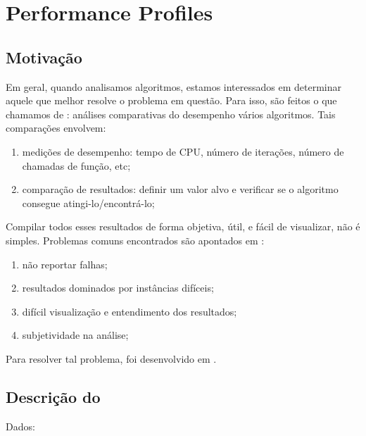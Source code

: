\section{Performance Profiles}
\label{section:performance-profiles}

\subsection{Motivação}
\label{subsection:motivation-perfprof}

Em geral, quando analisamos algoritmos, estamos interessados em determinar aquele que melhor resolve o problema em questão. Para isso, são feitos o que chamamos de \benchmarks: análises comparativas do desempenho vários algoritmos. Tais comparações envolvem:

\begin{enumerate}
    \item medições de desempenho: tempo de CPU, número de iterações, número de chamadas de função, etc;
    \item comparação de resultados: definir um valor alvo e verificar se o algoritmo consegue atingi-lo/encontrá-lo;
\end{enumerate}

Compilar todos esses resultados de forma objetiva, útil, e fácil de visualizar, não é simples. Problemas comuns encontrados são apontados em \cite{bib:performance-profile}:

\begin{enumerate}
    \item não reportar falhas;
    \item resultados dominados por instâncias difíceis;
    \item difícil visualização e entendimento dos resultados;
    \item subjetividade na análise;
\end{enumerate}

Para resolver tal problema, foi desenvolvido em \cite{bib:performance-profile} \perfprof.

\subsection{Descrição do \perfprof}

Dados:

